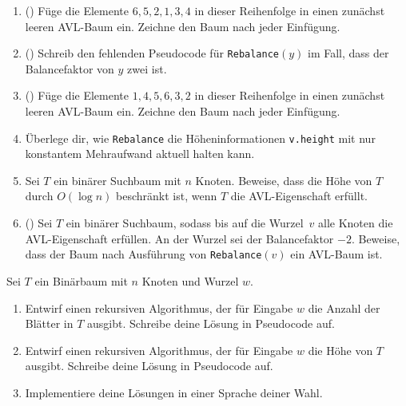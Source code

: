 \documentclass{uebung_cs}
\begin{document}
\begin{aufgabe}\mbox{}
	\begin{enumerate}
		\item(\warmup)
		Füge die Elemente $6, 5, 2, 1, 3, 4$ in dieser Reihenfolge in einen zunächst leeren AVL-Baum ein.
		Zeichne den Baum nach jeder Einfügung.
		\item(\warmup)
		Schreib den fehlenden Pseudocode für \texttt{Rebalance}$(y)$ im Fall, dass der Balancefaktor von $y$ zwei ist.
	\item(\warmup)
		Füge die Elemente $1, 4, 5, 6, 3, 2$ in dieser Reihenfolge in einen zunächst leeren AVL-Baum ein.
		Zeichne den Baum nach jeder Einfügung.
		\item Überlege dir, wie \texttt{Rebalance} die Höheninformationen \texttt{v.height} mit nur konstantem Mehraufwand aktuell halten kann.
		\item Sei $T$ ein binärer Suchbaum mit $n$ Knoten.
		Beweise, dass die Höhe von $T$ durch $O(\log n)$ beschränkt ist, wenn $T$ die AVL-Eigenschaft erfüllt.
		\item(\hard) Sei $T$ ein binärer Suchbaum, sodass bis auf die Wurzel~$v$ alle Knoten die AVL-Eigenschaft erfüllen. An der Wurzel sei der Balancefaktor $-2$. Beweise, dass der Baum nach Ausführung von \texttt{Rebalance}$(v)$ ein AVL-Baum ist.
	\end{enumerate}
\end{aufgabe}

\begin{aufgabe}
	Sei $T$ ein Binärbaum mit $n$ Knoten und Wurzel $w$.
	\begin{enumerate}
		\item Entwirf einen rekursiven Algorithmus, der für Eingabe $w$ die Anzahl der Blätter in $T$ ausgibt.
		Schreibe deine Lösung in Pseudocode auf.
		\item Entwirf einen rekursiven Algorithmus, der für Eingabe $w$ die Höhe von $T$ ausgibt.
		Schreibe deine Lösung in Pseudocode auf.
		\item Implementiere deine Lösungen in einer Sprache deiner Wahl.
	\end{enumerate}
\end{aufgabe}
\end{document}
